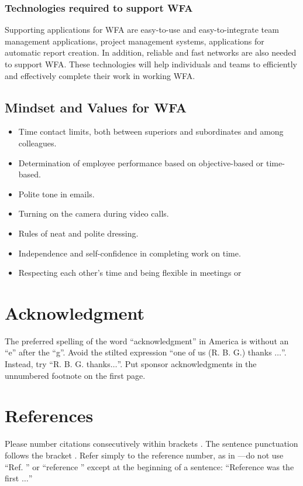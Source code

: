 \documentclass[conference]{IEEEtran}
\begin{document}
\subsubsection{Technologies required to support WFA} 
\hfill \break \hspace{\parindent}
Supporting applications for WFA are easy-to-use and easy-to-integrate team management applications, project management systems, applications for automatic report creation. In addition, reliable and fast networks are also needed to support WFA. These technologies will help individuals and teams to efficiently and effectively complete their work in working WFA.


\subsection{Mindset and Values for WFA}
\begin{itemize}
\item Time contact limits, both between superiors and subordinates and among colleagues.
\item Determination of employee performance based on objective-based or time-based.
\item Polite tone in emails.
\item Turning on the camera during video calls.
\item Rules of neat and polite dressing.
\item Independence and self-confidence in completing work on time.
\item Respecting each other's time and being flexible in meetings or
\end{itemize}


\section*{Acknowledgment}

The preferred spelling of the word ``acknowledgment'' in America is without 
an ``e'' after the ``g''. Avoid the stilted expression ``one of us (R. B. 
G.) thanks $\ldots$''. Instead, try ``R. B. G. thanks$\ldots$''. Put sponsor 
acknowledgments in the unnumbered footnote on the first page.

\section*{References}

Please number citations consecutively within brackets \cite{b1}. The 
sentence punctuation follows the bracket \cite{b2}. Refer simply to the reference 
number, as in \cite{b3}---do not use ``Ref. \cite{b3}'' or ``reference \cite{b3}'' except at 
the beginning of a sentence: ``Reference \cite{b3} was the first $\ldots$''
\end{document}
